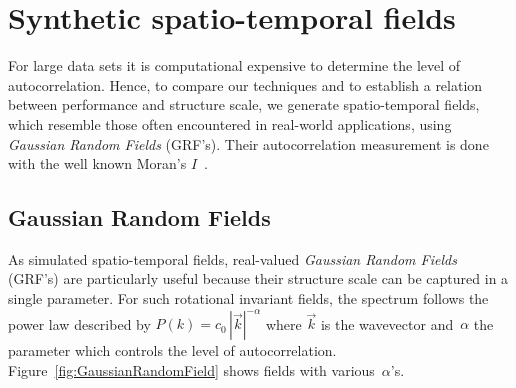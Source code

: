 \documentclass[ijgi,article,submit,moreauthors,pdftex,10pt,a4paper]{Definitions/mdpi}
\begin{document}
%
%

\section{Synthetic spatio-temporal fields}
\label{sec:Syntetic spatio-temporal fields}

For large data sets it is computational expensive to determine the level of autocorrelation. Hence, to compare our techniques and to establish a relation between performance and structure scale, we generate spatio-temporal fields, which resemble those often encountered in real-world applications, using \textit{Gaussian Random Fields} (GRF's). Their autocorrelation measurement is done with the well known Moran's $I$~\cite{Moran1950, Hubert1981, PySAL}.

\subsection{Gaussian Random Fields}
\label{sec:Autocorrelation/Gausssian Random Fields}
As simulated spatio-temporal fields, real-valued \textit{Gaussian Random Fields} (GRF's) are particularly useful because their structure scale can be captured in a single parameter. For such rotational invariant fields, the spectrum follows the power law described by $P(k) = c_{0} \, |\vec{k}|^{-\alpha}$ where $\vec{k}$ is the wavevector and~$\alpha$ the parameter which controls the level of autocorrelation. Figure~\ref{fig:GaussianRandomField} shows fields with various~$\alpha$'s.
\end{document}
